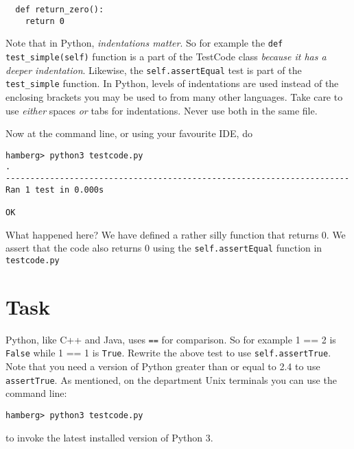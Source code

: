 \documentclass{paper}
\begin{document}
\begin{lstlisting}
  def return_zero():
    return 0
\end{lstlisting}
Note that in Python, \emph{indentations matter}. So for example the {\tt def
  test\_simple(self)} function is a part of the TestCode class \emph{because
  it has a deeper indentation}. Likewise, the {\tt self.assertEqual} test is
part of the {\tt test\_simple} function. In Python, levels of indentations are
used instead of the enclosing brackets you may be used to from many other
languages. Take care to use \emph{either} spaces \emph{or} tabs for
indentations. Never use both in the same file.

Now at the command line, or using your favourite IDE, do
\begin{verbatim}
hamberg> python3 testcode.py
.
----------------------------------------------------------------------
Ran 1 test in 0.000s

OK

\end{verbatim}
What happened here? We have defined a rather silly function that returns 0. We
assert that the code also returns 0 using the {\tt self.assertEqual} function
in {\tt testcode.py}
  
\section{Task}
Python, like C++ and Java, uses {\tt ==} for comparison. So for example {1 ==
  2} is {\tt False} while {1 == 1} is {\tt True}. Rewrite the above test to
use {\tt self.assertTrue}. Note that you need a version of Python greater than
or equal to 2.4 to use {\tt assertTrue}. As mentioned, on the department Unix
terminals you can use the command line:
\begin{verbatim}
hamberg> python3 testcode.py
\end{verbatim}
to invoke the latest installed version of Python 3.
\end{document}
